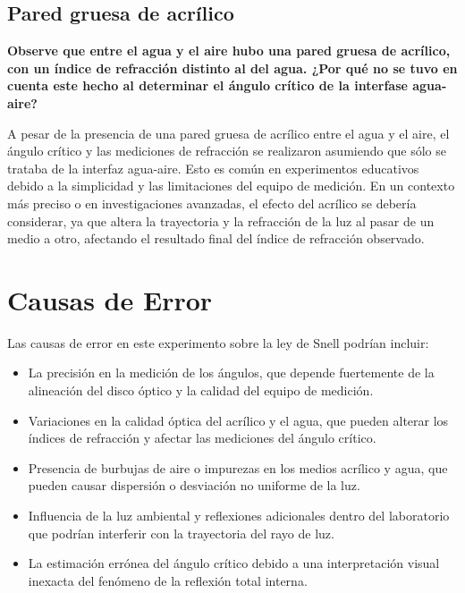\subsection{Pared gruesa de acrílico}
\textbf{Observe que entre el agua y el aire hubo una pared gruesa de acrílico, con un índice
de refracción distinto al del agua. ¿Por qué no se tuvo en cuenta este hecho al
determinar el ángulo crítico de la interfase agua-aire?}

A pesar de la presencia de una pared gruesa de acrílico entre el agua y el aire, el ángulo crítico y las mediciones de refracción se realizaron asumiendo que sólo se trataba de la interfaz agua-aire. Esto es común en experimentos educativos debido a la simplicidad y las limitaciones del equipo de medición. En un contexto más preciso o en investigaciones avanzadas, el efecto del acrílico se debería considerar, ya que altera la trayectoria y la refracción de la luz al pasar de un medio a otro, afectando el resultado final del índice de refracción observado.

\section{Causas de Error}
Las causas de error en este experimento sobre la ley de Snell podrían incluir:
\begin{itemize}
    \item La precisión en la medición de los ángulos, que depende fuertemente de la alineación del disco óptico y la calidad del equipo de medición.
    \item Variaciones en la calidad óptica del acrílico y el agua, que pueden alterar los índices de refracción y afectar las mediciones del ángulo crítico.
    \item Presencia de burbujas de aire o impurezas en los medios acrílico y agua, que pueden causar dispersión o desviación no uniforme de la luz.
    \item Influencia de la luz ambiental y reflexiones adicionales dentro del laboratorio que podrían interferir con la trayectoria del rayo de luz.
    \item La estimación errónea del ángulo crítico debido a una interpretación visual inexacta del fenómeno de la reflexión total interna.
\end{itemize}

